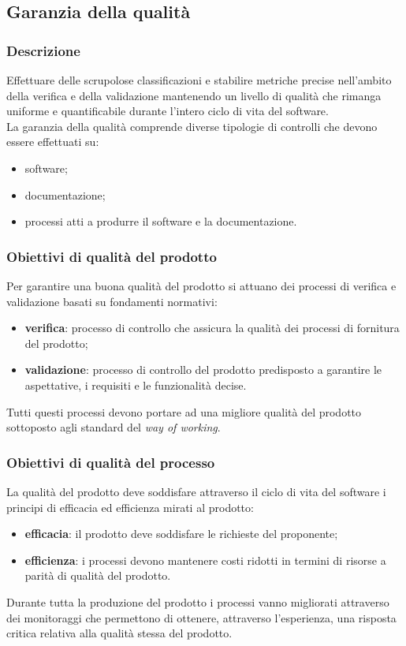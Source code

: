 \subsection{Garanzia della qualità}
					
	\subsubsection{Descrizione}
	Effettuare delle scrupolose classificazioni e stabilire metriche precise nell'ambito della verifica e della validazione mantenendo un livello di qualità che rimanga uniforme e quantificabile durante l'intero ciclo di vita del software.
	\\
	La garanzia della qualità comprende diverse tipologie di controlli che devono essere effettuati su:
	\begin{itemize}
		\item software;
		\item documentazione;
		\item processi atti a produrre il software e la documentazione.						
	\end{itemize}	
				
	\subsubsection{Obiettivi di qualità del prodotto}	
	Per garantire una buona qualità del prodotto si attuano dei processi di verifica e validazione basati su fondamenti normativi:
	\begin{itemize}
		\item \textbf{verifica}: processo di controllo che assicura la qualità dei processi di fornitura del prodotto;
		\item \textbf{validazione}: processo di controllo del prodotto predisposto a garantire le aspettative, i requisiti e le funzionalità decise.
	\end{itemize}
	Tutti questi processi devono portare ad una migliore qualità del prodotto sottoposto agli standard del \textit{way of working}.
					
	\subsubsection{Obiettivi di qualità del processo}
	La qualità del prodotto deve soddisfare attraverso il ciclo di vita del software i principi di efficacia ed efficienza mirati al prodotto:
	\begin{itemize}
		\item \textbf{efficacia}: il prodotto deve soddisfare le richieste del proponente;
		\item \textbf{efficienza}: i processi devono mantenere costi ridotti in termini di risorse a parità di qualità del prodotto.
	\end{itemize}
	Durante tutta la produzione del prodotto i processi vanno migliorati attraverso dei monitoraggi che permettono di ottenere, attraverso l'esperienza, una risposta critica relativa alla qualità stessa del prodotto.
					
